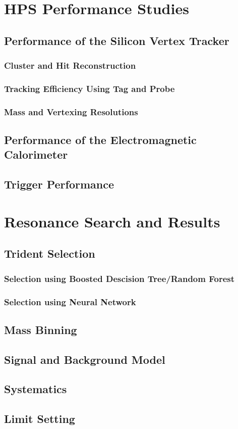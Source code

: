 \documentclass[12pt]{report}
\begin{document}
\chapter{HPS Performance Studies}

\section{Performance of the Silicon Vertex Tracker}
\subsection{Cluster and Hit Reconstruction}
\subsection{Tracking Efficiency Using Tag and Probe}
\subsection{Mass and Vertexing Resolutions}

\section{Performance of the Electromagnetic Calorimeter}

\section{Trigger Performance}

\chapter{Resonance Search and Results}
\section{Trident Selection}
\subsection{Selection using Boosted Descision Tree/Random Forest}
\subsection{Selection using Neural Network}
\section{Mass Binning}
\section{Signal and Background Model}
\section{Systematics}
\section{Limit Setting}
\end{document}
